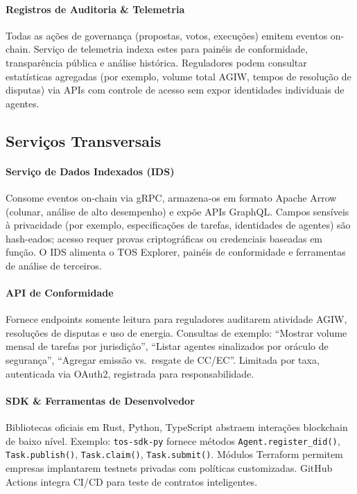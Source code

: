 \documentclass[11pt]{article}
\begin{document}
\paragraph{Registros de Auditoria \& Telemetria} Todas as ações de governança (propostas, votos, execuções) emitem eventos on-chain. Serviço de telemetria indexa estes para painéis de conformidade, transparência pública e análise histórica. Reguladores podem consultar estatísticas agregadas (por exemplo, volume total AGIW, tempos de resolução de disputas) via APIs com controle de acesso sem expor identidades individuais de agentes.

\subsection{Serviços Transversais}
\paragraph{Serviço de Dados Indexados (IDS)} Consome eventos on-chain via gRPC, armazena-os em formato Apache Arrow (colunar, análise de alto desempenho) e expõe APIs GraphQL. Campos sensíveis à privacidade (por exemplo, especificações de tarefas, identidades de agentes) são hash-eados; acesso requer provas criptográficas ou credenciais baseadas em função. O IDS alimenta o TOS Explorer, painéis de conformidade e ferramentas de análise de terceiros.

\paragraph{API de Conformidade} Fornece endpoints somente leitura para reguladores auditarem atividade AGIW, resoluções de disputas e uso de energia. Consultas de exemplo: ``Mostrar volume mensal de tarefas por jurisdição'', ``Listar agentes sinalizados por oráculo de segurança'', ``Agregar emissão vs.\ resgate de CC/EC''. Limitada por taxa, autenticada via OAuth2, registrada para responsabilidade.

\paragraph{SDK \& Ferramentas de Desenvolvedor} Bibliotecas oficiais em Rust, Python, TypeScript abstraem interações blockchain de baixo nível. Exemplo: \texttt{tos-sdk-py} fornece métodos \texttt{Agent.register\_did()}, \texttt{Task.publish()}, \texttt{Task.claim()}, \texttt{Task.submit()}. Módulos Terraform permitem empresas implantarem testnets privadas com políticas customizadas. GitHub Actions integra CI/CD para teste de contratos inteligentes.
\end{document}
